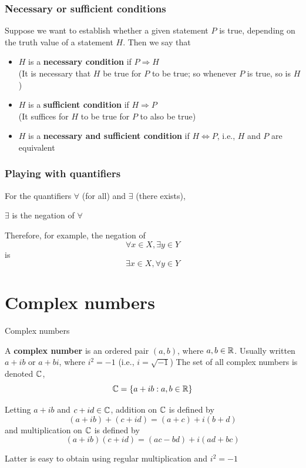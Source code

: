 \documentclass[aspectratio=169]{beamer}\usepackage[]{graphicx}\usepackage[]{xcolor}
\begin{document}
\begin{frame}
\frametitle{Necessary or sufficient conditions}
	Suppose we want to establish whether a given statement $P$ is true, depending
	on the truth value of a statement $H$. Then we say that
	\begin{itemize}
		\item $H$ is a \textbf{necessary condition} if $P\Rightarrow H$ \\
		(It is necessary that $H$ be true for $P$ to be true; so whenever
		$P$ is true, so is $H$)
		\vfill
		\item $H$ is a \textbf{sufficient condition} if $H\Rightarrow P$ \\
		(It suffices for $H$ to be true for $P$ to also be true)
		\vfill
		\item $H$ is a \textbf{necessary and sufficient condition} if $H\Leftrightarrow
		P$, i.e., $H$ and $P$ are equivalent
	\end{itemize}
\end{frame}

\begin{frame}
\frametitle{Playing with quantifiers}
	For the quantifiers $\forall$ (for all) and $\exists$ (there exists),
	\begin{center}
		$\exists$ is the negation of $\forall$
	\end{center}
	\vfill
	Therefore, for example, the negation of
	\[
	\forall x\in X,\exists y\in Y
	\]
	is
	\[
	\exists x\in X,\forall y\in Y
	\]
\end{frame}

\section{Complex numbers}

\begin{frame}{Complex numbers}
	\begin{definition}
		A \textbf{complex number} is an ordered pair $(a,b)$, where $a,b\in\mathbb{R}$. Usually written $a+ib$ or $a+bi$, where $i^2=-1$ (i.e., $i=\sqrt{-1}$)
		\vfill
		The set of all complex numbers is denoted $\mathbb{C}$, 
		\[
		\mathbb{C}=\{a+ib: a,b\in\mathbb{R}\}
		\]
	\end{definition}
\end{frame}

\begin{frame}
	\begin{definition}
		Letting $a+ib$ and $c+id\in\mathbb{C}$, addition on $\mathbb{C}$ is defined by
		\[
		(a+ib)+(c+id) = (a+c)+i(b+d)
		\]
		and multiplication on $\mathbb{C}$ is defined by
		\[
		(a+ib)(c+id) = (ac-bd)+i(ad+bc)
		\]
	\end{definition}
	\vfill
	Latter is easy to obtain using regular multiplication and $i^2=-1$
\end{frame}
\end{document}
